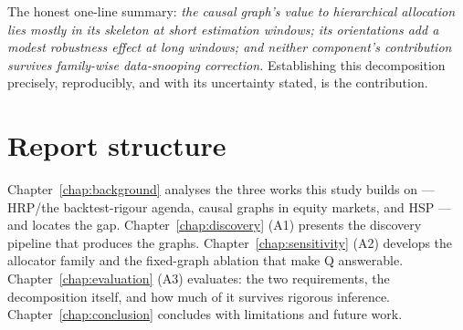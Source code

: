 The honest one-line summary: \emph{the causal graph's value to hierarchical
allocation lies mostly in its skeleton at short estimation windows; its
orientations add a modest robustness effect at long windows; and neither
component's contribution survives family-wise data-snooping correction.}
Establishing this decomposition precisely, reproducibly, and with its
uncertainty stated, is the contribution.

\section{Report structure}
\label{sec:structure}

Chapter~\ref{chap:background} analyses the three works this study builds on
--- HRP/the backtest-rigour agenda, causal graphs in equity markets, and HSP
--- and locates the gap. Chapter~\ref{chap:discovery} (A1) presents the
discovery pipeline that produces the graphs. Chapter~\ref{chap:sensitivity}
(A2) develops the allocator family and the fixed-graph ablation that make Q
answerable. Chapter~\ref{chap:evaluation} (A3) evaluates: the two
requirements, the decomposition itself, and how much of it survives rigorous
inference. Chapter~\ref{chap:conclusion} concludes with limitations and
future work.
